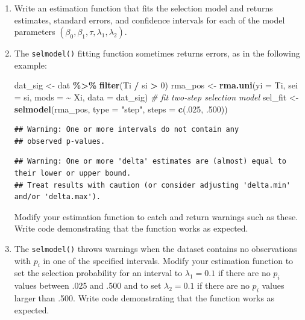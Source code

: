 \documentclass[
]{book}
\newenvironment{Shaded}{\begin{snugshade}}{\end{snugshade}}
\newcommand{\AttributeTok}[1]{\textcolor[rgb]{0.13,0.29,0.53}{#1}}
\newcommand{\CommentTok}[1]{\textcolor[rgb]{0.56,0.35,0.01}{\textit{#1}}}
\newcommand{\DecValTok}[1]{\textcolor[rgb]{0.00,0.00,0.81}{#1}}
\newcommand{\FunctionTok}[1]{\textcolor[rgb]{0.13,0.29,0.53}{\textbf{#1}}}
\newcommand{\NormalTok}[1]{#1}
\newcommand{\OtherTok}[1]{\textcolor[rgb]{0.56,0.35,0.01}{#1}}
\newcommand{\SpecialCharTok}[1]{\textcolor[rgb]{0.81,0.36,0.00}{\textbf{#1}}}
\newcommand{\StringTok}[1]{\textcolor[rgb]{0.31,0.60,0.02}{#1}}
\begin{document}
\begin{enumerate}
\def\labelenumi{\arabic{enumi}.}
\item
  Write an estimation function that fits the selection model and returns estimates, standard errors, and confidence intervals for each of the model parameters \((\beta_0,\beta_1,\tau,\lambda_1,\lambda_2)\).
\item
  The \texttt{selmodel()} fitting function sometimes returns errors, as in the following example:

\begin{Shaded}
\begin{Highlighting}[]
\NormalTok{dat\_sig }\OtherTok{\textless{}{-}}\NormalTok{ dat }\SpecialCharTok{\%\textgreater{}\%} \FunctionTok{filter}\NormalTok{(Ti }\SpecialCharTok{/}\NormalTok{ si }\SpecialCharTok{\textgreater{}} \DecValTok{0}\NormalTok{)}
\NormalTok{rma\_pos }\OtherTok{\textless{}{-}} \FunctionTok{rma.uni}\NormalTok{(}\AttributeTok{yi =}\NormalTok{ Ti, }\AttributeTok{sei =}\NormalTok{ si, }\AttributeTok{mods =} \SpecialCharTok{\textasciitilde{}}\NormalTok{ Xi, }\AttributeTok{data =}\NormalTok{ dat\_sig)}
\CommentTok{\# fit two{-}step selection model}
\NormalTok{sel\_fit }\OtherTok{\textless{}{-}} \FunctionTok{selmodel}\NormalTok{(rma\_pos, }\AttributeTok{type =} \StringTok{"step"}\NormalTok{, }\AttributeTok{steps =} \FunctionTok{c}\NormalTok{(.}\DecValTok{025}\NormalTok{, .}\DecValTok{500}\NormalTok{))}
\end{Highlighting}
\end{Shaded}

\begin{verbatim}
## Warning: One or more intervals do not contain any
## observed p-values.
\end{verbatim}

\begin{verbatim}
## Warning: One or more 'delta' estimates are (almost) equal to their lower or upper bound.
## Treat results with caution (or consider adjusting 'delta.min' and/or 'delta.max').
\end{verbatim}

  Modify your estimation function to catch and return warnings such as these.
  Write code demonstrating that the function works as expected.
\item
  The \texttt{selmodel()} throws warnings when the dataset contains no observations with \(p_i\) in one of the specified intervals.
  Modify your estimation function to set the selection probability for an interval to \(\lambda_1 = 0.1\) if there are no \(p_i\) values between .025 and .500 and to set \(\lambda_2 = 0.1\) if there are no \(p_i\) values larger than .500.
  Write code demonstrating that the function works as expected.
\end{enumerate}
\end{document}

